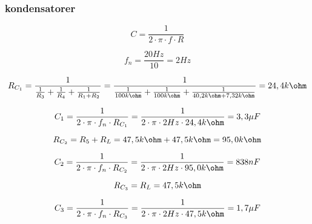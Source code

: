 \subsubsection*{kondensatorer}

\begin{equation}
C = \frac{1}{2 \cdot \pi \cdot f \cdot R}
\end{equation}

\begin{equation}
f_n = \frac{20 Hz}{10} = 2 Hz
\end{equation}

\begin{equation}
R_{C_1} = \frac{1}{\frac{1}{R_3} + \frac{1}{R_4} + \frac{1}{R_1 + R_2}} = \frac{1}{\frac{1}{100 k\ohm} + \frac{1}{100 k\ohm} + \frac{1}{40,2 k\ohm + 7,32 k\ohm}} = 24,4 k\ohm
\end{equation}

\begin{equation}
C_1 = \frac{1}{2 \cdot \pi \cdot f_n \cdot R_{C_1}} = \frac{1}{2 \cdot \pi \cdot 2 Hz \cdot 24,4 k\ohm} = 3,3 \mu F
\end{equation}

\begin{equation}
R_{C_2} = R_5 + R_L = 47,5 k\ohm + 47,5 k\ohm = 95,0 k\ohm
\end{equation}

\begin{equation}
C_2 = \frac{1}{2 \cdot \pi \cdot f_n \cdot R_{C_2} } = \frac{1}{2 \cdot \pi \cdot 2 Hz \cdot 95,0 k\ohm} = 838 nF
\end{equation}

\begin{equation}
R_{C_3} = R_L = 47,5 k\ohm
\end{equation}

\begin{equation}
C_3 = \frac{1}{2 \cdot \pi \cdot f_n \cdot R_{C_3} } = \frac{1}{2 \cdot \pi \cdot 2 Hz \cdot 47,5 k\ohm} = 1,7 \mu F
\end{equation}